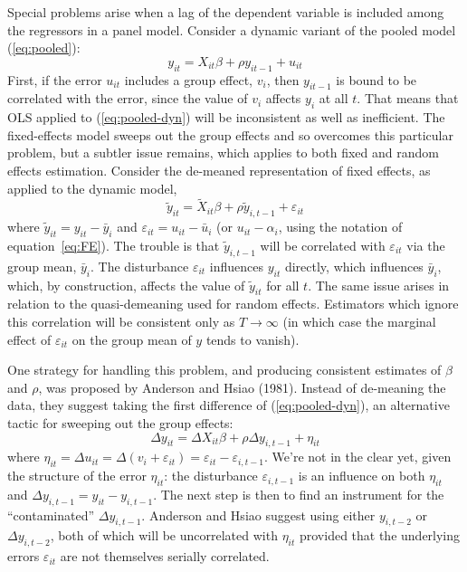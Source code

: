 Special problems arise when a lag of the dependent variable is
included among the regressors in a panel model.  Consider a dynamic
variant of the pooled model (\ref{eq:pooled}):
\begin{equation}
\label{eq:pooled-dyn}
y_{it} = X_{it}\beta + \rho y_{it-1} + u_{it}
\end{equation}
First, if the error $u_{it}$ includes a group effect, $v_i$, then
$y_{it-1}$ is bound to be correlated with the error, since the value
of $v_i$ affects $y_i$ at all $t$.  That means that OLS applied to
(\ref{eq:pooled-dyn}) will be inconsistent as well as inefficient.
The fixed-effects model sweeps out the group effects and so overcomes
this particular problem, but a subtler issue remains, which applies to
both fixed and random effects estimation.  Consider the de-meaned
representation of fixed effects, as applied to the dynamic model,
\[
\tilde{y}_{it} = \tilde{X}_{it}\beta + \rho \tilde{y}_{i,t-1} 
  + \varepsilon_{it}
\]
where $\tilde{y}_{it} = y_{it} - \bar{y}_i$ and $\varepsilon_{it} =
u_{it} - \bar{u}_i$ (or $u_{it} - \alpha_i$, using the notation of
equation~\ref{eq:FE}).  The trouble is that $\tilde{y}_{i,t-1}$ will be
correlated with $\varepsilon_{it}$ via the group mean, $\bar{y}_i$.
The disturbance $\varepsilon_{it}$ influences $y_{it}$ directly, which
influences $\bar{y}_i$, which, by construction, affects the value of
$\tilde{y}_{it}$ for all $t$.  The same issue arises in relation to
the quasi-demeaning used for random effects.  Estimators which ignore
this correlation will be consistent only as $T \to \infty$ (in which
case the marginal effect of $\varepsilon_{it}$ on the group mean of 
$y$ tends to vanish).  

One strategy for handling this problem, and producing consistent
estimates of $\beta$ and $\rho$, was proposed by Anderson and Hsiao
(1981).  Instead of de-meaning the data, they suggest taking the first
difference of (\ref{eq:pooled-dyn}), an alternative tactic for
sweeping out the group effects:
\begin{equation}
\label{eq:fe-dyn}
\Delta y_{it} = \Delta X_{it}\beta + \rho \Delta y_{i,t-1} 
  + \eta_{it}
\end{equation}
where $\eta_{it} = \Delta u_{it} = \Delta(v_i + \varepsilon_{it}) =
\varepsilon_{it} - \varepsilon_{i,t-1}$.  We're not in the clear yet,
given the structure of the error $\eta_{it}$: the disturbance
$\varepsilon_{i,t-1}$ is an influence on both $\eta_{it}$ and $\Delta
y_{i,t-1} = y_{it} - y_{i,t-1}$.  The next step is then to find an
instrument for the ``contaminated'' $\Delta y_{i,t-1}$. Anderson and
Hsiao suggest using either $y_{i,t-2}$ or $\Delta y_{i,t-2}$, both of
which will be uncorrelated with $\eta_{it}$ provided that the
underlying errors $\varepsilon_{it}$ are not themselves serially
correlated.

